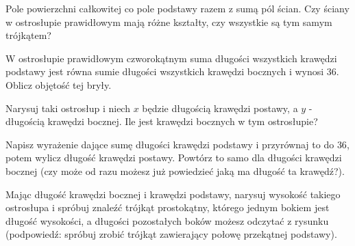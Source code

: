 \documentclass{article}
\begin{document}
Pole powierzchni całkowitej co pole podstawy razem z sumą pól ścian. Czy ściany w ostrosłupie prawidłowym mają różne kształty, czy wszystkie są tym samym trójkątem?

\begin{problem}[15]{}
W ostrosłupie prawidłowym czworokątnym suma długości wszystkich krawędzi podstawy jest równa sumie długości wszystkich krawędzi bocznych i wynosi $36$. Oblicz objętość tej bryły.
\end{problem}

Narysuj taki ostrosłup i niech $x$ będzie długością krawędzi postawy, a $y$ - długością krawędzi bocznej. Ile jest krawędzi bocznych w tym ostrosłupie?

Napisz wyrażenie dające sumę długości krawędzi podstawy i przyrównaj to do $36$, potem wylicz długość krawędzi postawy. Powtórz to samo dla długości krawędzi bocznej (czy może od razu możesz już powiedzieć jaką ma długość ta krawędź?).

Mając długość krawędzi bocznej i krawędzi podstawy, narysuj wysokość takiego ostrosłupa i spróbuj znaleźć trójkąt prostokątny, którego jednym bokiem jest długość wysokości, a długości pozostałych boków możesz odczytać z rysunku (podpowiedź: spróbuj zrobić trójkąt zawierający połowę przekątnej podstawy).
\end{document}
